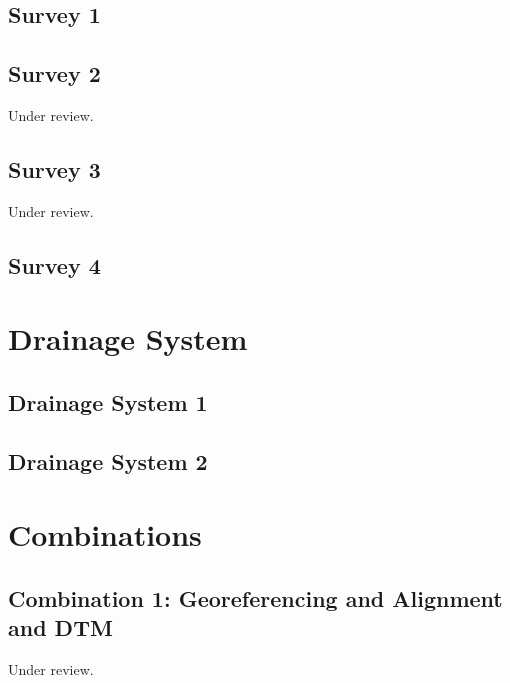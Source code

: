 \documentclass{scrartcl}
\begin{document}
\subsection{Survey 1}
\label{sec:survey_1}
\clearpage

\subsection{Survey 2} %
\label{sec:survey_2}
Under review.%
\clearpage

\subsection{Survey 3} %
\label{sec:survey_3}
Under review.%
\clearpage

\subsection{Survey 4} %
\label{sec:survey_4}
\clearpage


\section{Drainage System}
\label{sec:drainage_system}

\subsection{Drainage System 1}
\label{sec:drainage_1}
\clearpage

\subsection{Drainage System 2}
\label{sec:drainage_2}
\clearpage

\section{Combinations}
\label{sec:combinations}

\subsection{Combination 1: Georeferencing and Alignment and DTM} %
\label{sec:align_dtm_1}
Under review.%
\clearpage
\end{document}
